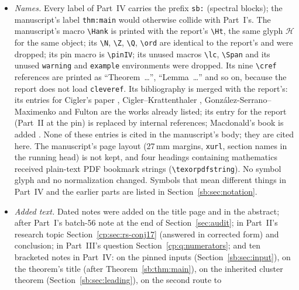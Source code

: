 \documentclass[11pt]{article}
\theoremstyle{definition}
\theoremstyle{remark}
\newcommand{\Z}{\mathbb Z}
\newcommand{\Q}{\mathbb Q}
\newcommand{\N}{\mathbb N}
\newcommand{\Ht}{\mathcal H}
\newcommand{\ord}{\operatorname{ord}}
\newcommand{\pinIV}{ffddaa8b9c89e7bf027e1442cc6216bb010906d0}
\theoremstyle{definition}
\theoremstyle{plain}
\numberwithin{equation}{section}
\begin{document}
\begin{itemize}
here, and its Theorem, Lemma, Proposition, Corollary and Algorithm~$n.m$
are $(n+34).m$; its Appendices~A--B are Appendices~H--I. The manuscript
numbers its equations consecutively, (1)--(60), through the whole article;
here they are numbered within sections, as in the rest of the report (the
report README gives the correspondence). This subsection and the next two
precede the manuscript's Section~1.1, which is Section~35.4 here. Its table
of contents is merged into the report's.
\item \emph{Names.} Every label of Part~IV carries the prefix
\texttt{sb:} (spectral blocks); the manuscript's label \texttt{thm:main}
would otherwise collide with Part~I's. The manuscript's macro
\verb|\Hank| is printed with the report's \verb|\Ht|, the same glyph
$\Ht$ for the same object; its \verb|\N|, \verb|\Z|, \verb|\Q|,
\verb|\ord| are identical to the report's and were dropped; its pin macro
is \verb|\pinIV|; its unused macros \verb|\lc|, \verb|\Span| and its unused
\texttt{warning} and \texttt{example} environments were dropped. Its nine
\verb|\cref| references are printed as ``Theorem~\ldots'',
``Lemma~\ldots'' and so on, because the report does not load
\texttt{cleveref}. Its bibliography is merged with the report's: its
entries for Cigler's paper \cite{Cigler}, Cigler--Krattenthaler \cite{CK},
Gonz\'alez-Serrano--Maximenko \cite{GSM} and Fulton \cite{Fulton} are the
works already listed; its entry for the report (Part~II at the pin) is
replaced by internal references; Macdonald's book is added
\cite{sbMacdonald}. None of these entries is cited in the manuscript's
body; they are cited here. The manuscript's page layout (27\,mm margins,
\texttt{xurl}, section names in the running head) is not kept, and four
headings containing mathematics received plain-text PDF bookmark strings
(\verb|\texorpdfstring|). No symbol glyph and no normalization changed. Symbols that mean different things in
Part~IV and the earlier parts are listed in Section~\ref{sb:sec:notation}.
\item \emph{Added text.} Dated notes were added on the title page and in
the abstract; after Part~I's batch-56 note at the end of
Section~\ref{sec:audit}; in Part~II's research topic
Section~\ref{cp:sec:rs-conj17} (answered in corrected form) and conclusion;
in Part~III's question Section~\ref{cp:q:numerators}; and ten bracketed
notes in Part~IV: on the pinned inputs (Section~\ref{sb:sec:input}),
on the theorem's title (after Theorem~\ref{sb:thm:main}), on the inherited
cluster theorem (Section~\ref{sb:sec:leading}), on the second route to

\end{itemize}
\end{document}

